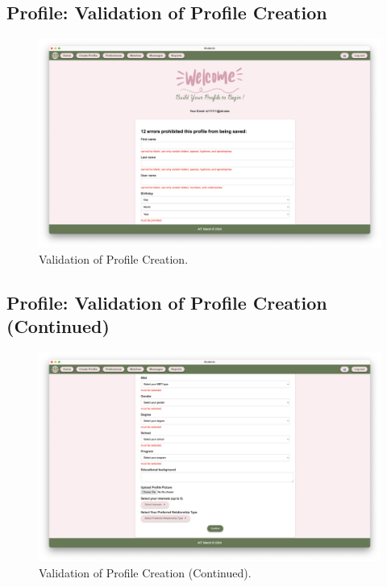         \newpage
        \subsection{Profile: Validation of Profile Creation}
        \begin{figure}[h]
                \centering
                \captionsetup{justification=centering, singlelinecheck=false, labelsep=space}
                \includegraphics[width=5in]{figures/results/profiles/create-profile-error.png} 
                \caption{Validation of Profile Creation.}
                \label{fig:create-profile-error}
            \end{figure}

        \subsection{Profile: Validation of Profile Creation (Continued)}
        \begin{figure}[h]
                \centering
                \captionsetup{justification=centering, singlelinecheck=false, labelsep=space}
                \includegraphics[width=5in]{figures/results/profiles/create-profile-error2.png} 
                \caption{Validation of Profile Creation (Continued).}
                \label{fig:create-profile-error2}
            \end{figure}

